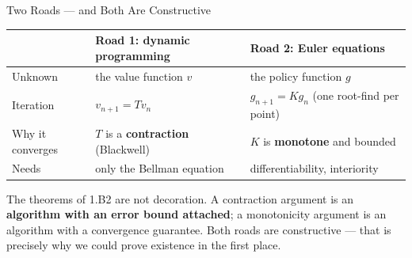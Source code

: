 \begin{frame}{Two Roads --- and Both Are Constructive}
\renewcommand{\arraystretch}{1.2}
\begin{center}\footnotesize
\begin{tabularx}{\linewidth}{>{\raggedright\arraybackslash}p{2.5cm} >{\raggedright\arraybackslash}X >{\raggedright\arraybackslash}X}
\toprule
 & \textbf{Road 1: dynamic programming} & \textbf{Road 2: Euler equations} \\
\midrule
Unknown & the value function $v$ & the policy function $g$ \\
Iteration & $v_{n+1}=Tv_n$ & $g_{n+1}=Kg_n$ (one root-find per point) \\
Why it converges & $T$ is a \textbf{contraction} (Blackwell) & $K$ is \textbf{monotone} and bounded \\
Needs & only the Bellman equation & differentiability, interiority \\
\bottomrule
\end{tabularx}
\end{center}
\vspace{1mm}
\begin{takeawaybox}\small
The theorems of 1.B2 are not decoration. A contraction argument is an \textbf{algorithm with an error bound attached}; a monotonicity argument is an algorithm with a convergence guarantee. Both roads are constructive --- that is precisely why we could prove existence in the first place.
\end{takeawaybox}
\vspace{1mm}
\end{frame}

